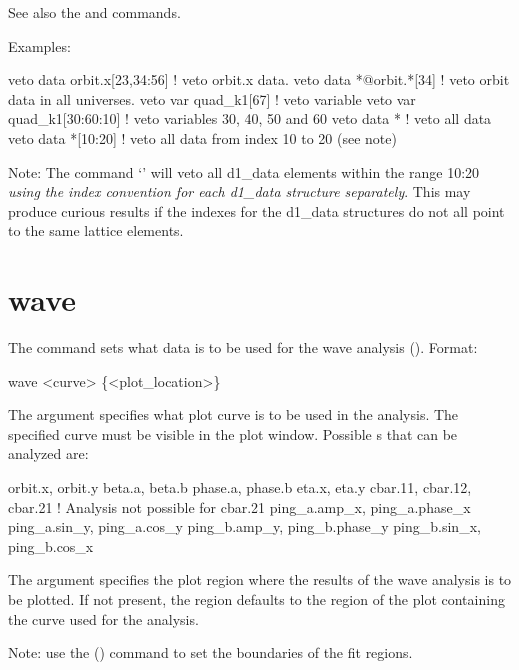 {{{{{{\vskip 7pt 

See also the  and  commands.

Examples:
\begin{example}
  veto data orbit.x[23,34:56]  ! veto orbit.x data.
  veto data *@orbit.*[34]      ! veto orbit data in all universes.
  veto var quad_k1[67]         ! veto variable
  veto var quad_k1[30:60:10]   ! veto variables 30, 40, 50 and 60
  veto data *                  ! veto all data
  veto data *[10:20]           ! veto all data from index 10 to 20 (see note)
\end{example}

Note: The command `' will veto all d1\_data elements within the
range 10:20 \textit{using the index convention for each d1\_data structure
separately}. This may produce curious results if the indexes for the d1\_data structures
do not all point to the same lattice elements.

\section{wave}
\label{s:wave}

The  command sets what data is to be used for the wave analysis (). 
Format:
\begin{example}
  wave <curve> \{<plot_location>\}
\end{example}

\vskip 7pt

The  argument specifies what plot curve is to be used in the analysis. The specified
curve must be visible in the plot window. Possible s that can be analyzed are:
\begin{example}
  orbit.x, orbit.y
  beta.a,  beta.b
  phase.a, phase.b
  eta.x, eta.y
  cbar.11, cbar.12, cbar.21      ! Analysis not possible for cbar.21
  ping_a.amp_x, ping_a.phase_x
  ping_a.sin_y, ping_a.cos_y
  ping_b.amp_y, ping_b.phase_y
  ping_b.sin_x, ping_b.cos_x
\end{example}

The  argument
specifies the plot region where the results of the wave analysis is to be plotted. If not
present, the region defaults to the region of the plot containing the curve used for the
analysis.

Note: use the  () command to set the boundaries of the fit regions.

}}}}}}
